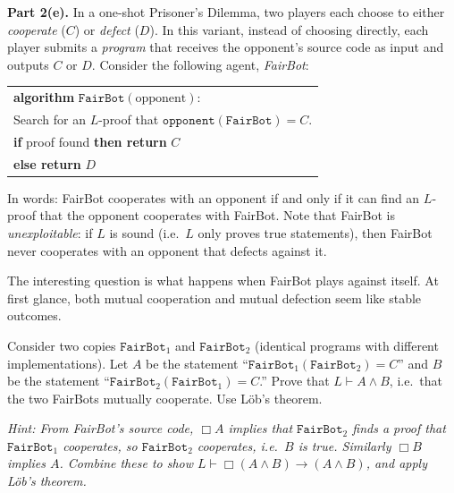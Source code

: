 \documentclass[11pt]{article}
\begin{document}
\begin{exercise}[L\"ob's theorem]
\medskip
\noindent
\textbf{Part 2(e).} In a one-shot Prisoner's Dilemma, two players each choose to
either \emph{cooperate} ($C$) or \emph{defect} ($D$). In this variant, instead of
choosing directly, each player submits a \emph{program} that receives the opponent's
source code as input and outputs $C$ or $D$. Consider the following agent,
\emph{FairBot}:

\medskip
\begin{center}
\begin{tabular}{l}
\textbf{algorithm} $\texttt{FairBot}(\text{opponent})$:\\
\quad Search for an $L$-proof that
  $\texttt{opponent}(\texttt{FairBot}) = C$.\\
\quad \textbf{if} proof found \textbf{then return} $C$\\
\quad \textbf{else return} $D$
\end{tabular}
\end{center}

\medskip
\noindent
In words: FairBot cooperates with an opponent if and only if it can find an $L$-proof
that the opponent cooperates with FairBot. Note that FairBot is
\emph{unexploitable}: if $L$ is sound (i.e.\ $L$ only proves true statements), then
FairBot never cooperates with an opponent that defects against it.

\medskip
\noindent
The interesting question is what happens when FairBot plays against itself. At first
glance, both mutual cooperation and mutual defection seem like stable outcomes.

\medskip
\noindent
Consider two copies $\texttt{FairBot}_1$ and $\texttt{FairBot}_2$ (identical programs
with different implementations). Let $A$ be the statement
``$\texttt{FairBot}_1(\texttt{FairBot}_2) = C$'' and $B$ be the statement
``$\texttt{FairBot}_2(\texttt{FairBot}_1) = C$.'' Prove that
$L \vdash A \wedge B$, i.e.\ that the two FairBots mutually cooperate. Use L\"ob's
theorem.

\medskip
\noindent
\emph{Hint: From FairBot's source code, $\Box A$ implies that
$\texttt{FairBot}_2$ finds a proof that $\texttt{FairBot}_1$ cooperates, so
$\texttt{FairBot}_2$ cooperates, i.e.\ $B$ is true. Similarly $\Box B$ implies $A$.
Combine these to show $L \vdash \Box(A \wedge B) \to (A \wedge B)$, and apply L\"ob's
theorem.}
\end{exercise}
\end{document}
